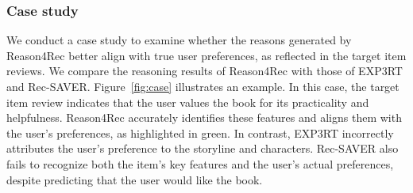 \subsubsection{\textbf{Case study}}
We conduct a case study to examine whether the reasons generated by Reason4Rec better align with true user preferences, as reflected in the target item reviews. We compare the reasoning results of Reason4Rec with those of EXP3RT and Rec-SAVER. Figure~\ref{fig:case} illustrates an example. In this case, the target item review indicates that the user values the book for its practicality and helpfulness. Reason4Rec accurately identifies these features and aligns them with the user's preferences, as highlighted in green. In contrast, EXP3RT incorrectly attributes the user's preference to the storyline and characters. Rec-SAVER also fails to recognize both the item's key features and the user's actual preferences, despite predicting that the user would like the book.



